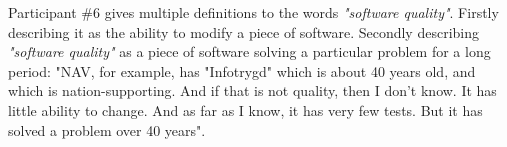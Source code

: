 Participant \#6 gives multiple definitions to the words \textit{"software quality"}. Firstly describing it as the ability to modify a piece of software. Secondly describing \textit{"software quality"} as a piece of software solving a particular problem for a long period: "NAV, for example, has "Infotrygd" which is about 40 years old, and which is nation-supporting. And if that is not quality, then I don't know. It has little ability to change. And as far as I know, it has very few tests. But it has solved a problem over 40 years".





